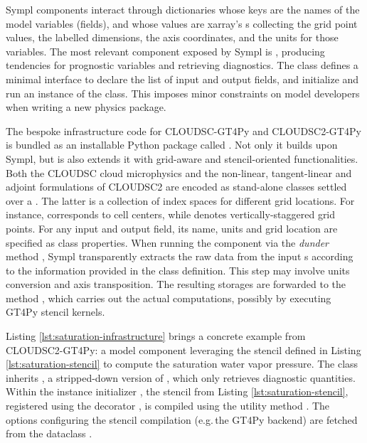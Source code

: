\documentclass[main.tex]{subfiles}
\begin{document}
        Sympl components interact through dictionaries whose keys are the names of the model variables (fields), and whose values are xarray's s \citep{hoyer17} collecting the grid point values, the labelled dimensions, the axis coordinates, and the units for those variables. The most relevant component exposed by Sympl is , producing tendencies for prognostic variables and retrieving diagnostics. The class defines a minimal interface to declare the list of input and output fields, and initialize and run an instance of the class. This imposes minor constraints on model developers when writing a new physics package.

        The bespoke infrastructure code for CLOUDSC-GT4Py and CLOUDSC2-GT4Py is bundled as an installable Python package called . Not only it builds upon Sympl, but is also extends it with grid-aware and stencil-oriented functionalities. Both the CLOUDSC cloud microphysics and the non-linear, tangent-linear and adjoint formulations of CLOUDSC2 are encoded as stand-alone  classes settled over a . The latter is a collection of index spaces for different grid locations. For instance,  corresponds to cell centers, while  denotes vertically-staggered grid points. For any input and output field, its name, units and grid location are specified as class properties. When running the component via the \emph{dunder} method , Sympl transparently extracts the raw data from the input s according to the information provided in the class definition. This step may involve units conversion and axis transposition. The resulting storages are forwarded to the method , which carries out the actual computations, possibly by executing GT4Py stencil kernels.
        
        Listing \ref{lst:saturation-infrastructure} brings a concrete example from CLOUDSC2-GT4Py: a model component leveraging the stencil defined in Listing \ref{lst:saturation-stencil} to compute the saturation water vapor pressure. The class inherits , a stripped-down version of , which only retrieves diagnostic quantities. Within the instance initializer , the stencil from Listing \ref{lst:saturation-stencil}, registered using the decorator , is compiled using the utility method . The options configuring the stencil compilation (e.g.\,the GT4Py backend) are fetched from the dataclass .

    \biblio
\end{document}
